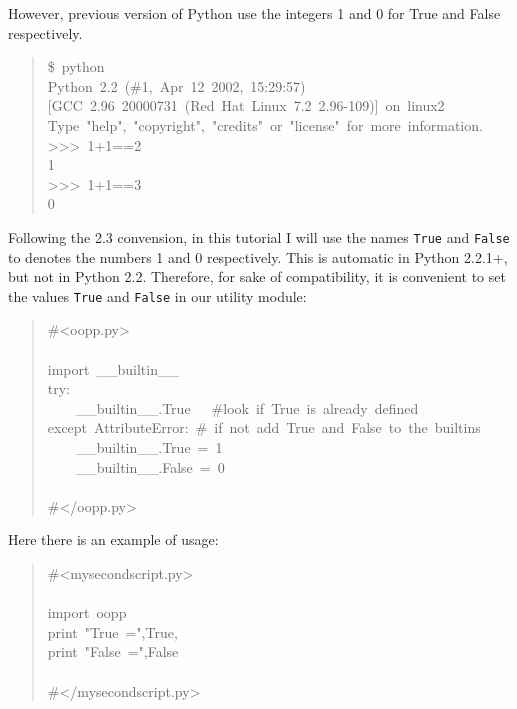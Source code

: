 \documentclass[10pt,english]{article}
\begin{document}
However, previous version of Python use the integers 1 and 0 for 
True and False respectively.
\begin{quote}
\begin{ttfamily}\begin{flushleft}
\mbox{{\$}~python}\\
\mbox{Python~2.2~({\#}1,~Apr~12~2002,~15:29:57)}\\
\mbox{[GCC~2.96~20000731~(Red~Hat~Linux~7.2~2.96-109)]~on~linux2}\\
\mbox{Type~"help",~"copyright",~"credits"~or~"license"~for~more~information.}\\
\mbox{>>>~1+1==2}\\
\mbox{1}\\
\mbox{>>>~1+1==3~}\\
\mbox{0}
\end{flushleft}\end{ttfamily}
\end{quote}

Following the 2.3 convension, in this tutorial I will use the names 
\texttt{True} and \texttt{False} to denotes the numbers 1 and 0 respectively. 
This is automatic in Python 2.2.1+, but not in Python 2.2. Therefore, 
for sake of compatibility, it is convenient to set the values \texttt{True} 
and \texttt{False} in our utility module:
\begin{quote}
\begin{ttfamily}\begin{flushleft}
\mbox{{\#}<oopp.py>}\\
\mbox{}\\
\mbox{import~{\_}{\_}builtin{\_}{\_}}\\
\mbox{try:~}\\
\mbox{~~~~{\_}{\_}builtin{\_}{\_}.True~~~{\#}look~if~True~is~already~defined}\\
\mbox{except~AttributeError:~{\#}~if~not~add~True~and~False~to~the~builtins}\\
\mbox{~~~~{\_}{\_}builtin{\_}{\_}.True~=~1}\\
\mbox{~~~~{\_}{\_}builtin{\_}{\_}.False~=~0}\\
\mbox{}\\
\mbox{{\#}</oopp.py>}
\end{flushleft}\end{ttfamily}
\end{quote}

Here there is an example of usage:
\begin{quote}
\begin{ttfamily}\begin{flushleft}
\mbox{{\#}<mysecondscript.py>}\\
\mbox{}\\
\mbox{import~oopp}\\
\mbox{print~"True~=",True,}\\
\mbox{print~"False~=",False}\\
\mbox{}\\
\mbox{{\#}</mysecondscript.py>}
\end{flushleft}\end{ttfamily}
\end{quote}
\end{document}
